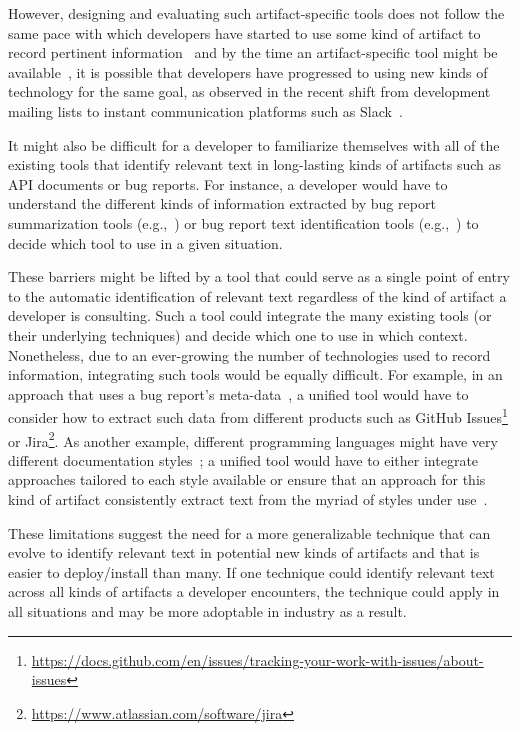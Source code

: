 However, designing and evaluating such artifact-specific tools
does not follow the same pace with which developers have started to use  
some kind of artifact to record pertinent information~\cite{garousi2019}
and by the time an artifact-specific tool might be available~\cite{gibbs1994},
it is possible 
that developers have progressed to using new kinds of technology
for the same goal, as observed in the recent shift from 
development mailing lists to instant communication platforms such as Slack~\cite{Lin2016, Chatterjee2020}. 


It might also be difficult for a developer to familiarize themselves 
with all of the existing tools that identify relevant text in 
long-lasting kinds of artifacts such as API documents or bug reports.
For instance, a developer would have to understand the different kinds of information 
extracted by 
bug report summarization tools (e.g.,~\cite{Rastkar2010, Lotufo2012,li2018deep})
or bug report text identification tools (e.g.,~\cite{huang2018automating, Arya2019, Chaparro2017})
 to decide which tool to use in a given situation. 



These barriers might be lifted by a tool that could serve as a single point of entry to the automatic identification of relevant text regardless of the kind of artifact a developer is consulting.
Such a tool could integrate the many existing tools (or their underlying techniques) and decide which one 
to use in which context. Nonetheless, 
due to an ever-growing the number of technologies used to record information,
integrating such tools would be equally difficult.
For example, in an approach that uses a bug report's meta-data~\cite{Lotufo2012,li2018deep}, a 
unified tool would have to 
consider how to extract such data from different products 
such as 
GitHub Issues\footnote{\url{https://docs.github.com/en/issues/tracking-your-work-with-issues/about-issues}} 
or Jira\footnote{\url{https://www.atlassian.com/software/jira}}.
As another example, different programming languages
might have very different documentation styles~\cite{endrikat2014}; a 
unified tool would have to either integrate approaches tailored to each style available 
or ensure that an approach for this kind of artifact
consistently 
extract text from the myriad of styles under use~\cite{robillard2011field}.



These limitations suggest the need for a more generalizable technique
that can evolve to 
identify relevant text in potential new kinds of artifacts 
and that is easier to deploy/install than many.
If one technique could identify relevant text across all kinds
of artifacts a developer encounters, the technique
could apply in all situations and may be more adoptable in industry
as a result. 




